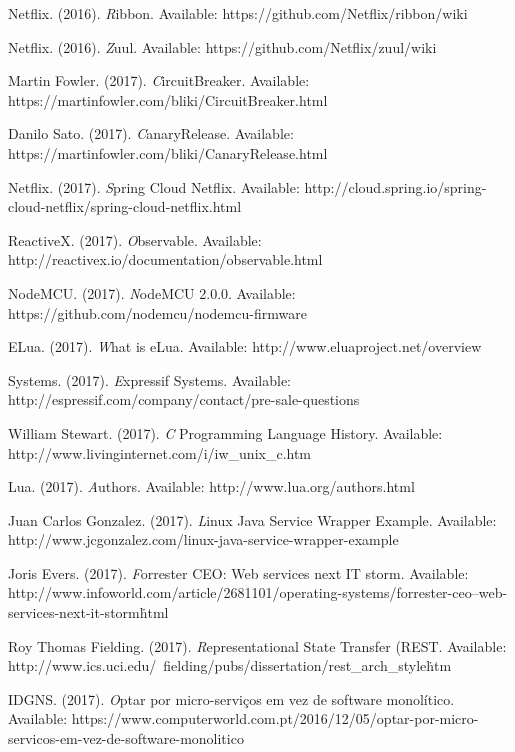 \documentclass[journal]{IEEEtran}
\begin{document}
\begin{thebibliography}{1}
Netflix. (2016). \emph Ribbon. Available: https://github.com/Netflix/ribbon/wiki 

Netflix. (2016). \emph Zuul. Available: https://github.com/Netflix/zuul/wiki 

Martin Fowler. (2017). \emph CircuitBreaker. Available: https://martinfowler.com/bliki/CircuitBreaker.html 

Danilo Sato. (2017). \emph CanaryRelease. Available: https://martinfowler.com/bliki/CanaryRelease.html 

Netflix. (2017). \emph Spring Cloud Netflix. Available: http://cloud.spring.io/spring-cloud-netflix/spring-cloud-netflix.html 

ReactiveX. (2017). \emph Observable. Available: http://reactivex.io/documentation/observable.html 

NodeMCU. (2017). \emph NodeMCU 2.0.0. Available: https://github.com/nodemcu/nodemcu-firmware 

ELua. (2017). \emph What is eLua. Available: http://www.eluaproject.net/overview 

Systems. (2017). \emph Expressif Systems. Available: http://espressif.com/company/contact/pre-sale-questions 

William Stewart. (2017). \emph C Programming Language History. Available: http://www.livinginternet.com/i/iw\_unix\_c.htm 

Lua. (2017). \emph Authors. Available: http://www.lua.org/authors.html 

Juan Carlos Gonzalez. (2017). \emph Linux Java Service Wrapper Example. Available: http://www.jcgonzalez.com/linux-java-service-wrapper-example 

Joris Evers. (2017). \emph Forrester CEO: Web services next IT storm. Available: http://www.infoworld.com/article/2681101/operating-systems/forrester-ceo--web-services-next-it-storm\.html 

Roy Thomas Fielding. (2017). \emph Representational State Transfer (REST. Available: http://www.ics.uci.edu/~fielding/pubs/dissertation/rest\_arch\_style\.htm 

IDGNS. (2017). \emph Optar por micro-serviços em vez de software monolítico. Available: https://www.computerworld.com.pt/2016/12/05/optar-por-micro-servicos-em-vez-de-software-monolitico


\end{thebibliography}
\end{document}
